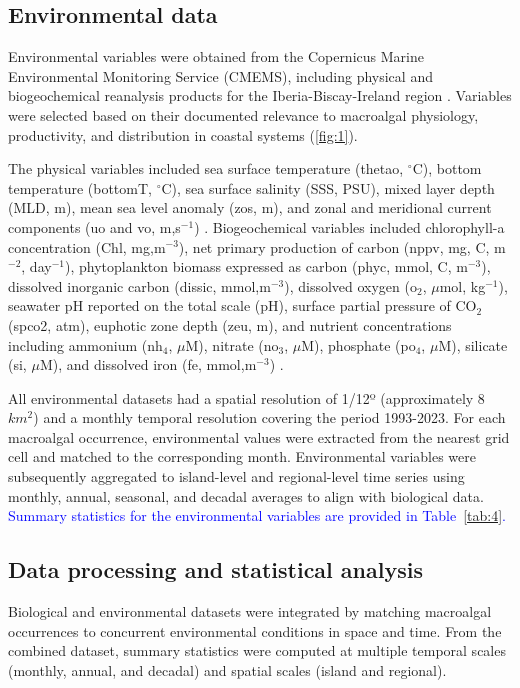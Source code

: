 \documentclass[a4paper,fleqn]{cas-sc}
\DeclareRobustCommand{\added}[1]{\textcolor{blue}{#1}}
\begin{document}
\subsection{Environmental data}

Environmental variables were obtained from the Copernicus Marine Environmental Monitoring Service (CMEMS), including physical and biogeochemical reanalysis products for the Iberia-Biscay-Ireland region \citep{CMEMS_BGC_IBI2024_Aznar2016, CMEMS_PHY_IBI2024, CMEMS_BGC_IBI2024}. Variables were selected based on their documented relevance to macroalgal physiology, productivity, and distribution in coastal systems (\ref{fig:1}). 

The physical variables included sea surface temperature (thetao, $^\circ$C), bottom temperature (bottomT, $^\circ$C), sea surface salinity (SSS, PSU), mixed layer depth (MLD, m), mean sea level anomaly (zos, m), and zonal and meridional current components (uo and vo, m,s$^{-1}$) \citep{CMEMS_PHY_IBI2024}.
Biogeochemical variables included chlorophyll-a concentration (Chl, mg,m$^{-3}$), net primary production of carbon (nppv, mg, C, m$^{-2}$, day$^{-1}$), phytoplankton biomass expressed as carbon (phyc, mmol, C, m$^{-3}$), dissolved inorganic carbon (dissic, mmol,m$^{-3}$), dissolved oxygen (o$_2$, $\mu$mol, kg$^{-1}$), seawater pH reported on the total scale (pH), surface partial pressure of CO$_2$ (spco2, atm), euphotic zone depth (zeu, m), and nutrient concentrations including ammonium (nh$_4$, $\mu$M), nitrate (no$_3$, $\mu$M), phosphate (po$_4$, $\mu$M), silicate (si, $\mu$M), and dissolved iron (fe, mmol,m$^{-3}$) \citep{CMEMS_BGC_IBI2024}.

All environmental datasets had a spatial resolution of 1/12º (approximately 8 $km^{2}$) and a monthly temporal resolution covering the period 1993-2023. For each macroalgal occurrence, environmental values were extracted from the nearest grid cell and matched to the corresponding month. Environmental variables were subsequently aggregated to island-level and regional-level time series using monthly, annual, seasonal, and decadal averages to align with biological data. \added{Summary statistics for the environmental variables are provided in Table~\ref{tab:4}.}

\subsection{Data processing and statistical analysis}

Biological and environmental datasets were integrated by matching macroalgal occurrences to concurrent environmental conditions in space and time. From the combined dataset, summary statistics were computed at multiple temporal scales (monthly, annual, and decadal) and spatial scales (island and regional).
\end{document}
